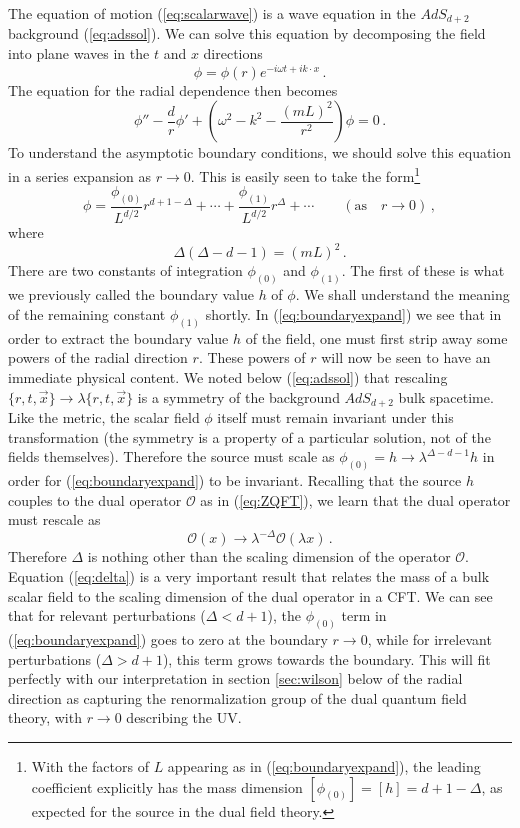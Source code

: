 \documentclass[10pt, oneside]{book}
\def\be{\begin{equation}}
\def\ee{\end{equation}}
\def\ocal{{\mathcal{O}}}
\begin{document}
\begin{doublespace}
The equation of motion (\ref{eq:scalarwave}) is a wave equation in the $AdS_{d+2}$ background (\ref{eq:adssol}). We can solve this equation by decomposing the field into plane waves in the $t$ and $x$ directions
\be
\phi = \phi(r) e^{- i \omega t + i k \cdot x} \,.
\ee
The equation for the radial dependence then becomes
\be\label{eq:radial}
\phi'' - \frac{d}{r} \phi' + \left(\omega^2 - k^2 - \frac{(m L)^2}{r^2} \right) \phi = 0 \,.
\ee
To understand the asymptotic boundary conditions, we should solve this equation in a series expansion as $r \to 0$. This is easily seen to take the form\footnote{With the factors of $L$ appearing as in (\ref{eq:boundaryexpand}), the leading coefficient explicitly has the mass dimension $[\phi_{(0)}] = [h] = d+1-\Delta$, as expected for the source in the dual field theory.}
\be\label{eq:boundaryexpand}
\phi = \frac{\phi_{(0)}}{L^{d/2}}r^{d+1-\Delta}  + \cdots + \frac{\phi_{(1)}}{L^{d/2}}r^\Delta  + \cdots \qquad (\text{as} \quad r \to 0) \,,
\ee
where
\be\label{eq:delta}
\Delta (\Delta - d-1) = \left(m L\right)^2 \,.
\ee
There are two constants of integration $\phi_{(0)}$ and $\phi_{(1)}$. The first of these is what we previously called the boundary value $h$ of $\phi$.  We shall understand the meaning of the remaining constant $\phi_{(1)}$ shortly. In (\ref{eq:boundaryexpand}) we see that in order to extract the boundary value $h$ of the field, one must first strip away some powers of the radial direction $r$. These powers of $r$ will now be seen to have an immediate physical content. We noted below (\ref{eq:adssol}) that rescaling $\{r,t,\vec x\} \to \lambda \{r,t,\vec x\}$ is a symmetry of the background $AdS_{d+2}$ bulk spacetime. Like the metric, the scalar field $\phi$ itself must remain invariant under this transformation (the symmetry is a property of a particular solution, not of the fields themselves). Therefore the source must scale as $\phi_{(0)} = h \to \lambda^{\Delta - d-1} h$ in order for (\ref{eq:boundaryexpand}) to be invariant. Recalling that the source $h$ couples to the dual operator $\ocal$ as in (\ref{eq:ZQFT}), we learn that the dual operator must rescale as
\be\label{eq:BigDelta}
\ocal(x) \to \lambda^{-\Delta} \ocal(\lambda x) \,.
\ee
Therefore $\Delta$ is nothing other than the scaling dimension of the operator $\ocal$. Equation (\ref{eq:delta}) is a very important result that relates the mass of a bulk scalar field to the scaling dimension of the dual operator in a CFT. We can see that for relevant perturbations ($\Delta < d+1$), the $\phi_{(0)}$ term in (\ref{eq:boundaryexpand}) goes to zero at the boundary $r \to 0$, while for irrelevant perturbations ($\Delta > d+1$), this term grows towards the boundary. This will fit perfectly with our interpretation in section \ref{sec:wilson} below of the radial direction as capturing the renormalization group of the dual quantum field theory, with $r \to 0$ describing the UV.


\end{doublespace}
\end{document}
